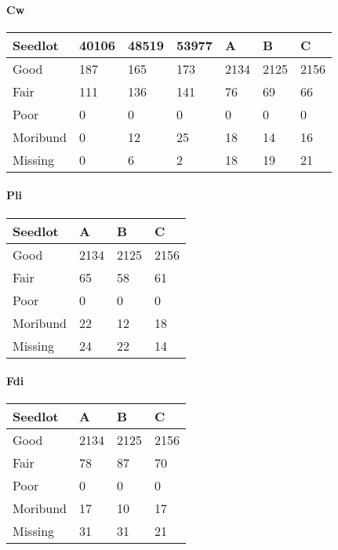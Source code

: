 \documentclass[
]{article}
\begin{document}
\hypertarget{cw}{%
\paragraph{Cw}\label{cw}}

\begin{tabular}{l|l|l|l|l|l|l}
\hline
Seedlot & 40106 & 48519 & 53977 & A & B & C\\
\hline
Good & 187 & 165 & 173 & 2134 & 2125 & 2156\\
\hline
Fair & 111 & 136 & 141 & 76 & 69 & 66\\
\hline
Poor & 0 & 0 & 0 & 0 & 0 & 0\\
\hline
Moribund & 0 & 12 & 25 & 18 & 14 & 16\\
\hline
Missing & 0 & 6 & 2 & 18 & 19 & 21\\
\hline
\end{tabular}

\hypertarget{pli}{%
\paragraph{Pli}\label{pli}}

\begin{tabular}{l|l|l|l}
\hline
Seedlot & A & B & C\\
\hline
Good & 2134 & 2125 & 2156\\
\hline
Fair & 65 & 58 & 61\\
\hline
Poor & 0 & 0 & 0\\
\hline
Moribund & 22 & 12 & 18\\
\hline
Missing & 24 & 22 & 14\\
\hline
\end{tabular}

\hypertarget{fdi}{%
\paragraph{Fdi}\label{fdi}}

\begin{tabular}{l|l|l|l}
\hline
Seedlot & A & B & C\\
\hline
Good & 2134 & 2125 & 2156\\
\hline
Fair & 78 & 87 & 70\\
\hline
Poor & 0 & 0 & 0\\
\hline
Moribund & 17 & 10 & 17\\
\hline
Missing & 31 & 31 & 21\\
\hline
\end{tabular}
\end{document}
